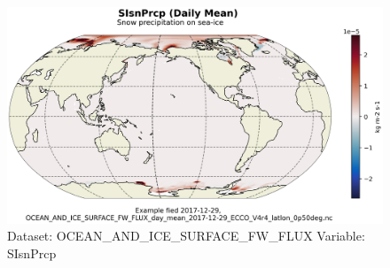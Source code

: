 \begin{figure}[H]
\centering
\includegraphics[scale=0.55]{../images/plots/latlon_plots/Ocean_and_Sea-Ice_Surface_Freshwater_Fluxes/SIsnPrcp.png}
\caption{Dataset: OCEAN\_AND\_ICE\_SURFACE\_FW\_FLUX Variable: SIsnPrcp}
\label{tab:table-OCEAN_AND_ICE_SURFACE_FW_FLUX_SIsnPrcp-Plot}
\end{figure}
\pagebreak
